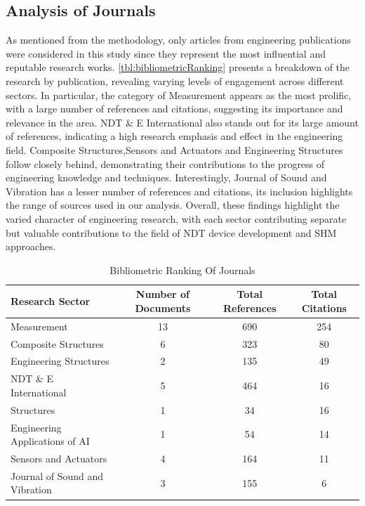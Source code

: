 \documentclass[journal, a4paper]{IEEEtran}
\begin{document}
\subsection{Analysis of Journals}
As mentioned from the methodology, only articles from engineering publications were considered
in this study since they represent the most influential and reputable research works. \autoref{tbl:bibliometricRanking}
presents a breakdown of the research by publication, revealing varying levels of engagement across different sectors.
In particular, the category of Measurement appears as the most prolific,
with a large number of references and citations, suggesting its importance and relevance in the area.
NDT \& E International  also stands out for its large amount of references,
indicating a high research emphasis and effect in the engineering field.
Composite Structures,Sensors and Actuators and Engineering Structures  follow closely behind,
demonstrating their contributions to the progress of engineering knowledge and techniques.
Interestingly,  Journal of Sound and Vibration has a lesser number of references and citations,
its inclusion highlights the range of sources used in our analysis.
Overall, these findings highlight the varied character of engineering research,
with each sector contributing separate but valuable contributions to the field of NDT device development and SHM approaches.

\begin{table}[htbp]

  \centering
  \caption{Bibliometric Ranking Of Journals}
  \label{tbl:bibliometricRanking}
  \begin{tabular}{lccc}

      \toprule
      \textbf{Research Sector} & \textbf{Number of Documents} & \textbf{Total References} & \textbf{Total Citations}  \\
      \midrule
      Measurement & 13 & 690 & 254 \\
      Composite Structures & 6 & 323 & 80 \\
      Engineering Structures & 2 & 135 & 49 \\
      NDT \& E International & 5 & 464 & 16 \\
      Structures & 1 & 34 & 16 \\
      Engineering Applications of AI & 1 & 54 & 14 \\
      Sensors and Actuators & 4 & 164 & 11 \\
      Journal of Sound and Vibration & 3 & 155 & 6 \\

      \bottomrule
  \end{tabular}
\end{table}
\end{document}
